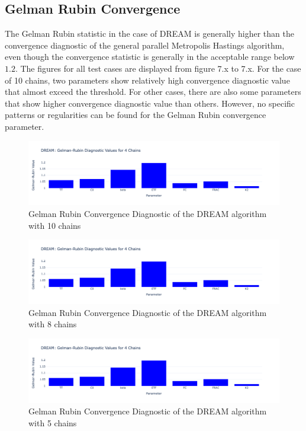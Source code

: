 \subsection{Gelman Rubin Convergence}
The Gelman Rubin statistic in the case of DREAM is generally higher than the convergence diagnostic of the general parallel Metropolis Hastings algorithm, even though the convergence statistic is generally in the acceptable range below $1.2$. The figures for all test cases are displayed from figure 7.x to 7.x. For the case of 10 chains, two parameters show relatively high convergence diagnostic value that almost exceed the threshold. For other cases, there are also some parameters that show higher convergence diagnostic value than others. However, no specific patterns or regularities can be found for the Gelman Rubin convergence parameter. 

\begin{figure}[H]
    \centering
    \includegraphics[width=1\textwidth]{figures/dream/gr_10.png}
    \captionsetup{width=.8\textwidth}
    \caption{Gelman Rubin Convergence Diagnostic of the DREAM algorithm with 10 chains}
    \label{fig:enter-label}
\end{figure}

\begin{figure}[H]
    \centering
    \includegraphics[width=1\textwidth]{figures/dream/gr_8.png}
    \captionsetup{width=.8\textwidth}
    \caption{Gelman Rubin Convergence Diagnostic of the DREAM algorithm with 8 chains}
    \label{fig:enter-label}
\end{figure}

\begin{figure}[H]
    \centering
    \includegraphics[width=1\textwidth]{figures/dream/gr_5.png}
    \captionsetup{width=.8\textwidth}
    \caption{Gelman Rubin Convergence Diagnostic of the DREAM algorithm with 5 chains}
    \label{fig:enter-label}
\end{figure}

